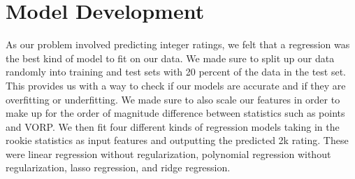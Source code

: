 \documentclass{article}
\begin{document}
\section{Model Development}
As our problem involved predicting integer ratings, we felt that a regression was the best kind of model to fit on our data. We made sure to split up our data randomly into training and test sets with 20 percent of the data in the test set. This provides us with a way to check if our models are accurate and if they are overfitting or underfitting. We made sure to also scale our features in order to make up for the order of magnitude difference between statistics such as points and VORP. We then fit four different kinds of regression models taking in the rookie statistics as input features and outputting the predicted 2k rating. These were linear regression without regularization, polynomial regression without regularization, lasso regression, and ridge regression.
\end{document}
